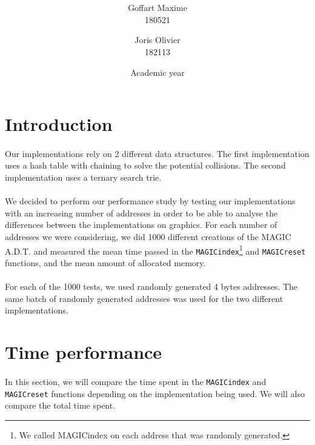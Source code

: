 \documentclass[a4paper, 11pt, oneside]{article}
\title{\ClassName\\\vspace*{0.8cm}\ProjectName\vspace{0.8cm}}
\author{Goffart Maxime \\180521 \and Joris Olivier \\ 182113}
\date{\vspace{1cm}Academic year \AcademicYear}
\begin{document}
\begin{titlingpage}
{\let\newpage\relax\maketitle}
\end{titlingpage}

\section{Introduction}
\paragraph{}Our implementations rely on 2 different data structures. The first implementation uses a hash table with chaining to solve the potential collisions. The second implementation uses a ternary search trie.
\paragraph{}We decided to perform our performance study by testing our implementations with an increasing number of addresses in order to be able to analyse the differences between the implementations on graphics. For each number of addresses we were considering, we did 1000 different creations of the MAGIC A.D.T. and measured the mean time passed in the \texttt{MAGICindex}\footnote{We called MAGICindex on each address that was randomly generated.} and \texttt{MAGICreset} functions, and the mean amount of allocated memory. 
\paragraph{}For each of the 1000 tests, we used randomly generated 4 bytes addresses. The same batch of randomly generated addresses was used for the two different implementations.

\section{Time performance}
\paragraph{}In this section, we will compare the time spent in the \texttt{MAGICindex} and \texttt{MAGICreset} functions depending on the implementation being used. We will also compare the total time spent.
\end{document}
